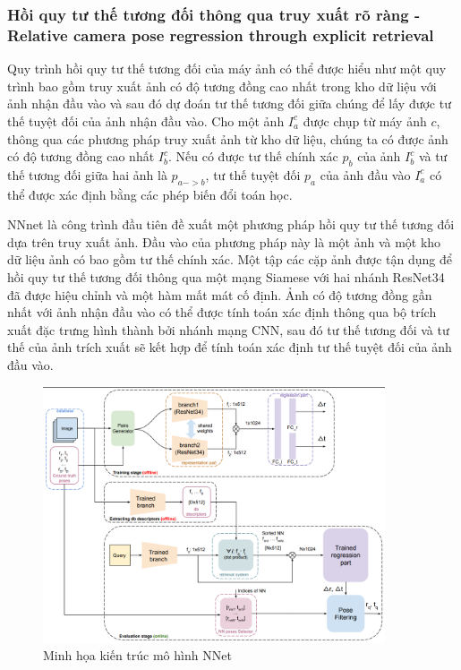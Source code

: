 \subsubsection*{Hồi quy tư thế tương đối thông qua truy xuất rõ ràng - Relative camera pose regression through explicit retrieval}
Quy trình hồi quy tư thế tương đối của máy ảnh có thể được hiểu như một quy trình bao gồm truy xuất ảnh có độ tương đồng cao nhất trong kho dữ liệu với ảnh nhận đầu vào và sau đó dự đoán tư thế tương đối giữa chúng để lấy được tư thế tuyệt đối của ảnh nhận đầu vào. Cho một ảnh $I_a^c$ được chụp từ máy ảnh $c$, thông qua các phương pháp truy xuất ảnh từ kho dữ liệu, chúng ta có được ảnh có độ tương đồng cao nhất $I_b^c$. Nếu có được tư thế chính xác $p_b$ của ảnh $I_b^c$ và tư thế tương đối giữa hai ảnh là $p_{a->b}$, tư thế tuyệt đối $p_a$ của ảnh đầu vào $I_a^c$ có thể được xác định bằng các phép biến đổi toán học.

NNnet \cite{laskar2017camera} là công trình đầu tiên đề xuất một phương pháp hồi quy tư thế tương đối dựa trên truy xuất ảnh. Đầu vào của phương pháp này là một ảnh và một kho dữ liệu ảnh có bao gồm tư thế chính xác. Một tập các cặp ảnh được tận dụng để hồi quy tư thế tương đối thông qua một mạng Siamese với hai nhánh ResNet34 đã được hiệu chỉnh và một hàm mất mát cố định. Ảnh có độ tương đồng gần nhất với ảnh nhận đầu vào có thể được tính toán xác định thông qua bộ trích xuất đặc trưng hình thành bởi nhánh mạng CNN, sau đó tư thế tương đối và tư thế của ảnh trích xuất sẽ kết hợp để tính toán xác định tư thế tuyệt đối của ảnh đầu vào.
\begin{figure}[H]
    \centering
    \includegraphics[width=0.9\textwidth]{pics/Chapter2/nnet.png}
    \caption{Minh họa kiến trúc mô hình NNet \cite{laskar2017camera}}
\end{figure}

